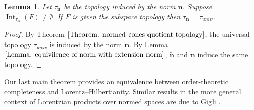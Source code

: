 \documentclass[a4paper,11pt]{article}
\numberwithin{equation}{section}
\theoremstyle{definition}
\theoremstyle{plain}
\newtheorem{Lemma}[Definition]{Lemma}
\DeclareMathOperator{\Int}{Int}
\begin{document}
\begin{Lemma}
    Let $\tau_{\mathbf{n}}$ be the topology induced by the norm $\mathbf{n}$. Suppose $\Int_{\tau_{\mathbf{n}}}(F) \neq \emptyset$. If $F$ is given the subspace topology then $\tau_{\mathbf{n}} = \tau_{univ}$.
\end{Lemma}
\begin{proof}
    By Theorem $\ref{Theorem: normed cones quotient topology}$, the universal topology $\tau_{univ}$ is induced by the norm $\tilde{\mathbf{n}}$. By Lemma $\ref{Lemma: equivilence of norm with extension norm}$,  $\tilde{\mathbf{n}}$ and $\mathbf{n}$ induce the same topology.
\end{proof}

Our last main theorem provides an equivalence between order-theoretic completeness and Lorentz--Hilbertianity. Similar results in the more general context of Lorentzian products over normed spaces are due to Gigli \cite{gigli2025hyperbolic2}.
\end{document}
